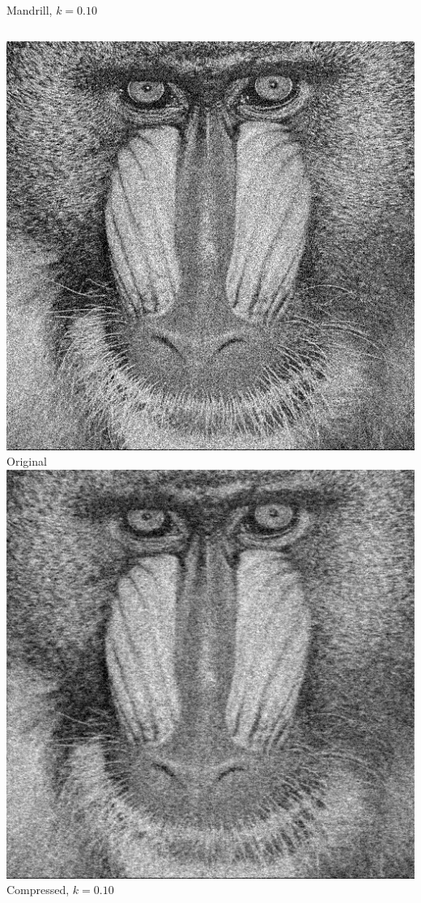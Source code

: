 \documentclass[12pt]{beamer}
\begin{document}
\begin{frame}{Mandrill, \(k=0.10\)}
  \begin{columns}
      \includegraphics[width=\textwidth]{Mandrill.jpg}\\
      \footnotesize Original
      \includegraphics[width=\textwidth]{Mandrill_k10.png}\\
      \footnotesize Compressed, \(k=0.10\)
  \end{columns}
\end{frame}
\end{document}
